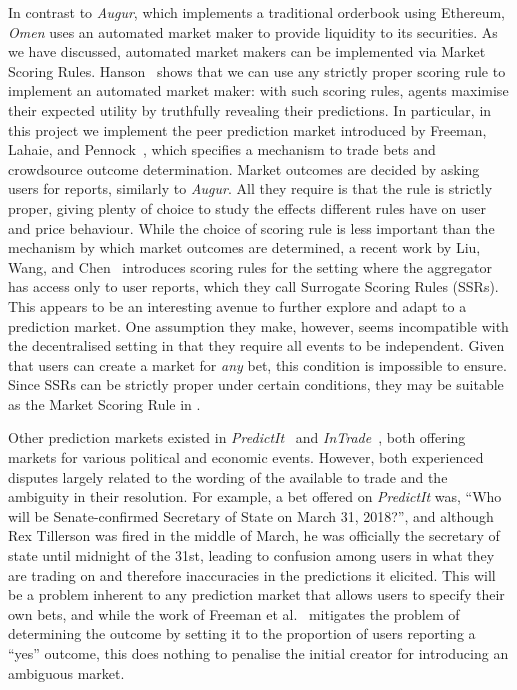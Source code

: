 In contrast to \emph{Augur}, which implements a traditional orderbook using
Ethereum, \emph{Omen} uses an automated market maker to provide liquidity to
its securities. As we have discussed, automated market makers can be
implemented via Market Scoring Rules. Hanson~\cite{Hanson2003} shows that we
can use any strictly proper scoring rule to implement an automated market
maker: with such scoring rules, agents maximise their expected utility by
truthfully revealing their predictions. In particular, in this project we
implement the peer prediction market introduced by Freeman, Lahaie, and
Pennock~\cite{Freeman2017}, which specifies a mechanism to trade bets and
crowdsource outcome determination. Market outcomes are decided by asking users
for reports, similarly to \emph{Augur}. All they require is that the rule is
strictly proper, giving plenty of choice to study the effects different rules
have on user and price behaviour. While the choice of scoring rule is less
important than the mechanism by which market outcomes are determined, a recent
work by Liu, Wang, and Chen~\cite{Liu2020} introduces scoring rules for the
setting where the aggregator has access only to user reports, which they call
Surrogate Scoring Rules (SSRs). This appears to be an interesting avenue to
further explore and adapt to a prediction market. One assumption they make,
however, seems incompatible with the decentralised setting in that they require
all events to be independent.  Given that users can create a market for
\emph{any} bet, this condition is impossible to ensure. Since SSRs can be
strictly proper under certain conditions, they may be suitable as the Market
Scoring Rule in \cite{Freeman2017}. 

Other prediction markets existed in \emph{PredictIt}~\cite{PredictIt} and
\emph{InTrade}~\cite{InTrade}, both offering markets for various political and
economic events. However, both experienced disputes largely related to the
wording of the available to trade and the ambiguity in their resolution. For
example, a bet offered on \emph{PredictIt} was, ``Who will be Senate-confirmed
Secretary of State on March 31, 2018?'', and although Rex Tillerson was fired
in the middle of March, he was officially the secretary of state until midnight
of the 31st, leading to confusion among users in what they are trading on and
therefore inaccuracies in the predictions it elicited. This will be a problem
inherent to any prediction market that allows users to specify their own bets,
and while the work of Freeman et al.~\cite{Freeman2017} mitigates the problem of
determining the outcome by setting it to the proportion of users reporting a
``yes'' outcome, this does nothing to penalise the initial creator for
introducing an ambiguous market.

